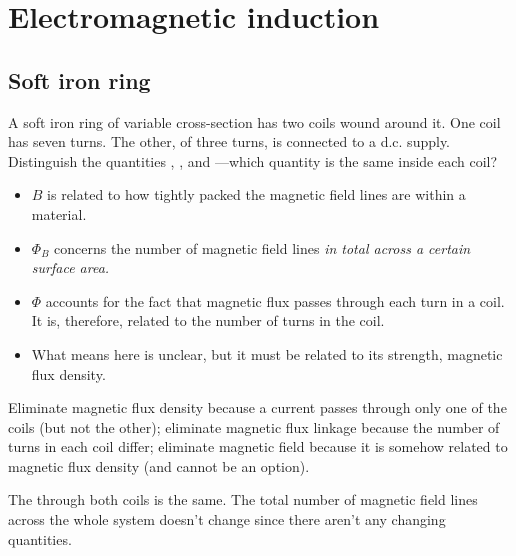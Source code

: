 \chapter{Electromagnetic induction}

\section{Soft iron ring}
\begin{problem}
A soft iron ring of variable cross-section has two coils wound around it.
One coil has seven turns. The other, of three turns, is connected to a
d.c. supply. Distinguish the quantities ,
,  and ---which
quantity is the same inside each coil?
\end{problem}

\begin{itemize}
	\item {} \(B\) is related to how tightly packed the magnetic field lines
	      are within a material.
	\item {} \(\Phi_B\) concerns the number of magnetic field lines \it{in total} across
	      a certain surface area.
	\item {} \(\Phi\) accounts for the fact that magnetic flux passes through
	      each turn in a coil. It is, therefore, related to the number of turns in the coil.
	\item What  means here is unclear, but it must be related to its strength, magnetic flux
	      density.
\end{itemize}

Eliminate magnetic flux density because a current passes through only one of the coils (but not the other);
eliminate magnetic flux linkage because the number of turns in each coil differ;
eliminate magnetic field because it is somehow related to magnetic flux density (and cannot be an option).

The  through both coils is the same. The total number of magnetic field lines
across the whole system doesn't change since there aren't any changing quantities.


